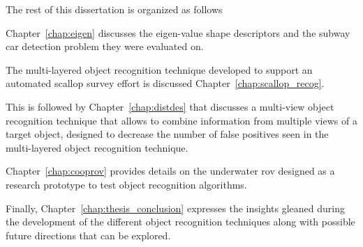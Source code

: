 \documentclass {udthesis}
\begin{document}
The rest of this dissertation is organized as follows 
\begin{enumerate*}[label=(\roman*)] 
  \item Chapter~\ref{chap:eigen} discusses the eigen-value shape descriptors and the subway car detection problem they were evaluated on.
  \item The multi-layered object recognition technique developed to support an automated scallop survey effort 
  is discussed Chapter~\ref{chap:scallop_recog}.
  \item This is followed by Chapter~\ref{chap:distdes} that discusses a multi-view object recognition technique that allows to combine information from multiple views of a target object, designed to decrease the number of false positives seen in the multi-layered object recognition technique.
  \item Chapter~\ref{chap:cooprov} provides details on the underwater \gls{rov} designed as a research prototype to test object recognition algorithms.
  \item Finally, Chapter~\ref{chap:thesis_conclusion} expresses the insights gleaned during the development of the different object recognition techniques along with possible future directions that can be explored.
\end{enumerate*}

\printglossary[type=\acronymtype]                  
\end{document}
